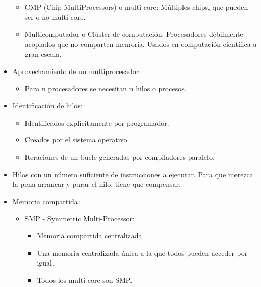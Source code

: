 \documentclass[12pt, twoside, openright]{report} %
\begin{document}
\begin{itemize}
	      \begin{itemize}

		      \item CMP (Chip MultiProcessors) o multi-core: Múltiples chips, que
		            pueden ser o no multi-core.
		      \item Multicomputador o Clúster de computación: Procesadores
		            débilmente acoplados que no comparten memoria. Usados en
		            computación científica a gran escala.
	      \end{itemize}
	\item Aprovechamiento de un multiprocesador:

	      \begin{itemize}

		      \item Para n procesadores se necesitan n hilos o procesos.
	      \end{itemize}
	\item Identificación de hilos:

	      \begin{itemize}

		      \item Identificados explícitamente por programador.
		      \item Creados por el sistema operativo.
		      \item Iteraciones de un bucle generadas por compiladores paralelo.
	      \end{itemize}
	\item Hilos con un número suficiente de instrucciones a ejecutar. Para
	      que merezca la pena arrancar y parar el hilo, tiene que
	      compensar.
	\item Memoria compartida:

	      \begin{itemize}

		      \item SMP - Symmetric Multi-Processor:

		            \begin{itemize}
			            \item Memoria compartida centralizada.

			            \item Una memoria centralizada única a la que todos pueden acceder
			                  por igual.

			            \item Todos los multi-core son SMP.


\end{itemize}
\end{itemize}
\end{itemize}
\end{document}
